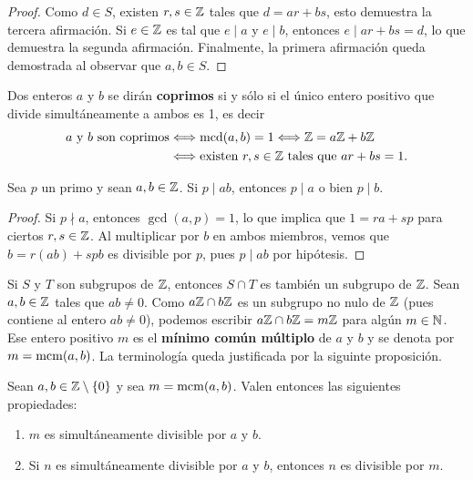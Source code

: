 \begin{proof}
    Como $d\in S$, existen $r,s\in\mathbb{Z}$ tales que $d=ar+bs$, esto demuestra la tercera afirmación. Si $e\in\mathbb{Z}$ es tal que $e\mid a$ y $e\mid b$, 
    entonces $e\mid ar+bs=d$, lo que demuestra la segunda afirmación. Finalmente, la primera afirmación queda demostrada al observar que
    $a,b\in S$. 
\end{proof}

Dos enteros $a$ y $b$ se dirán \textbf{coprimos} si y sólo si 
el único entero positivo que divide simultáneamente a ambos es 1, es decir 
\begin{align*}
a\text{ y }b\text{ son coprimos}&\Longleftrightarrow \operatorname{mcd}(a,b)=1\Longleftrightarrow \mathbb{Z}=a\mathbb{Z}+b\mathbb{Z}\\
&\Longleftrightarrow \text{existen $r,s\in\mathbb{Z}$ tales que $ar+bs=1$.}
\end{align*}



\begin{proposition}
Sea $p$ un primo y sean $a,b\in\mathbb{Z}$. Si $p\mid ab$, entonces $p\mid a$ o bien $p\mid b$.
\end{proposition}

\begin{proof}
Si $p\nmid a$, entonces $\gcd(a,p)=1$, lo que implica que $1=ra+sp$ para ciertos $r,s\in\mathbb{Z}$. Al multiplicar por $b$ en ambos miembros, vemos que
$b=r(ab)+spb$ es divisible por $p$, pues $p\mid ab$ por hipótesis.
\end{proof}

Si $S$ y $T$ son subgrupos de $\mathbb{Z}$, entonces $S\cap T$ es también un subgrupo de $\mathbb{Z}$. 
Sean $a,b\in\mathbb{Z}$ tales que $ab\ne 0$. Como $a\mathbb{Z}\cap b\mathbb{Z}$ es un subgrupo 
no nulo de $\mathbb{Z}$ (pues contiene al entero $ab\ne 0$), podemos escribir $a\mathbb{Z}\cap b\mathbb{Z}=m\mathbb{Z}$ 
para algún $m\in\mathbb{N}$. Ese entero positivo $m$ 
es el \textbf{mínimo común múltiplo} de $a$ y $b$ y se denota por $m=\operatorname{mcm}(a,b)$. 
La terminología queda justificada por la siguinte proposición.

\begin{proposition}
Sean $a,b\in\mathbb{Z}\setminus\{0\}$ y sea $m=\operatorname{mcm}(a,b)$. Valen entonces las siguientes propiedades:
\begin{enumerate}
	\item $m$ es simultáneamente divisible por $a$ y $b$.
	\item Si $n$ es simultáneamente divisible por $a$ y $b$, entonces $n$ es divisible por $m$. 
\end{enumerate}	
\end{proposition}


